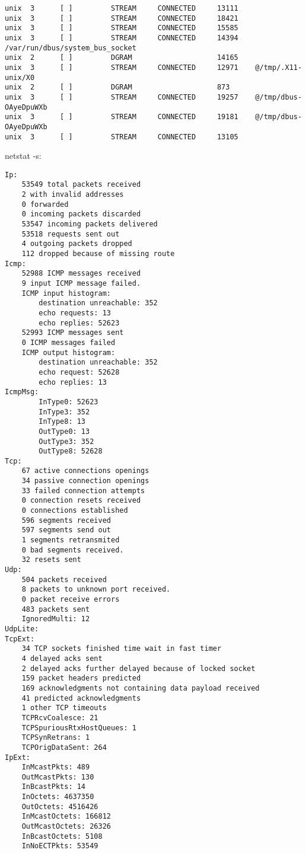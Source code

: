 \begin{lstlisting}
unix  3      [ ]         STREAM     CONNECTED     13111    
unix  3      [ ]         STREAM     CONNECTED     18421    
unix  3      [ ]         STREAM     CONNECTED     15585    
unix  3      [ ]         STREAM     CONNECTED     14394    /var/run/dbus/system_bus_socket
unix  2      [ ]         DGRAM                    14165    
unix  3      [ ]         STREAM     CONNECTED     12971    @/tmp/.X11-unix/X0
unix  2      [ ]         DGRAM                    873      
unix  3      [ ]         STREAM     CONNECTED     19257    @/tmp/dbus-OAyeDpuWXb
unix  3      [ ]         STREAM     CONNECTED     19181    @/tmp/dbus-OAyeDpuWXb
unix  3      [ ]         STREAM     CONNECTED     13105    
\end{lstlisting}


netstat -s:

\begin{lstlisting}
Ip:
    53549 total packets received
    2 with invalid addresses
    0 forwarded
    0 incoming packets discarded
    53547 incoming packets delivered
    53518 requests sent out
    4 outgoing packets dropped
    112 dropped because of missing route
Icmp:
    52988 ICMP messages received
    9 input ICMP message failed.
    ICMP input histogram:
        destination unreachable: 352
        echo requests: 13
        echo replies: 52623
    52993 ICMP messages sent
    0 ICMP messages failed
    ICMP output histogram:
        destination unreachable: 352
        echo request: 52628
        echo replies: 13
IcmpMsg:
        InType0: 52623
        InType3: 352
        InType8: 13
        OutType0: 13
        OutType3: 352
        OutType8: 52628
Tcp:
    67 active connections openings
    34 passive connection openings
    33 failed connection attempts
    0 connection resets received
    0 connections established
    596 segments received
    597 segments send out
    1 segments retransmited
    0 bad segments received.
    32 resets sent
Udp:
    504 packets received
    8 packets to unknown port received.
    0 packet receive errors
    483 packets sent
    IgnoredMulti: 12
UdpLite:
TcpExt:
    34 TCP sockets finished time wait in fast timer
    4 delayed acks sent
    2 delayed acks further delayed because of locked socket
    159 packet headers predicted
    169 acknowledgments not containing data payload received
    41 predicted acknowledgments
    1 other TCP timeouts
    TCPRcvCoalesce: 21
    TCPSpuriousRtxHostQueues: 1
    TCPSynRetrans: 1
    TCPOrigDataSent: 264
IpExt:
    InMcastPkts: 489
    OutMcastPkts: 130
    InBcastPkts: 14
    InOctets: 4637350
    OutOctets: 4516426
    InMcastOctets: 166812
    OutMcastOctets: 26326
    InBcastOctets: 5108
    InNoECTPkts: 53549
\end{lstlisting}

